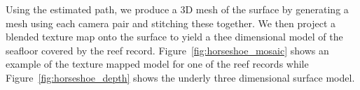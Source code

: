 Using the estimated path, we produce a 3D mesh of the surface by generating a mesh using each camera pair and stitching these together.  We then project a blended texture map onto the surface to yield a thee dimensional model of the seafloor covered by the reef record.  Figure~\ref{fig:horseshoe_mosaic} shows an example of the texture mapped model for one of the reef records while Figure~\ref{fig:horseshoe_depth} shows the underly three dimensional surface model.